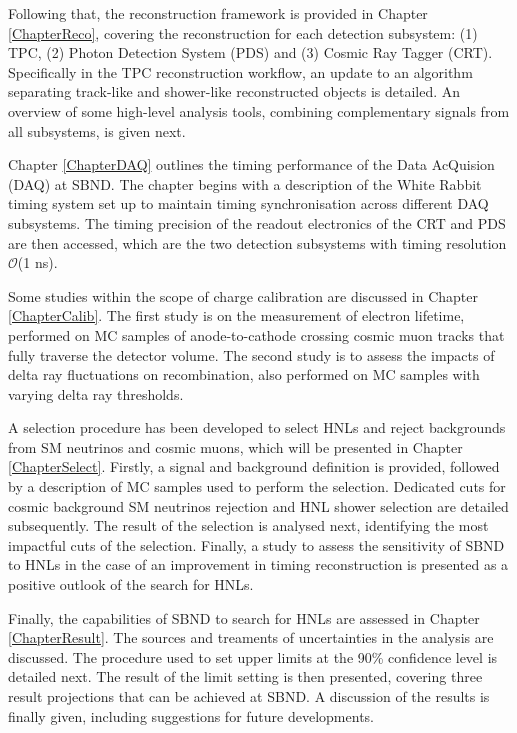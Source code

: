Following that, the reconstruction framework is provided in Chapter \ref{ChapterReco}, covering the reconstruction for each detection subsystem: (1) TPC, (2) Photon Detection System (PDS) and (3) Cosmic Ray Tagger (CRT).
Specifically in the TPC reconstruction workflow, an update to an algorithm separating track-like and shower-like reconstructed objects is detailed.
An overview of some high-level analysis tools, combining complementary signals from all subsystems, is given next. 
                                                                                                                       
Chapter \ref{ChapterDAQ} outlines the timing performance of the Data AcQuision (DAQ) at SBND.
The chapter begins with a description of the White Rabbit timing system set up to maintain timing synchronisation across different DAQ subsystems.
The timing precision of the readout electronics of the CRT and PDS are then accessed, which are the two detection subsystems with timing resolution $\mathcal{O}$(1 ns).

Some studies within the scope of charge calibration are discussed in Chapter \ref{ChapterCalib}.
The first study is on the measurement of electron lifetime, performed on MC samples of anode-to-cathode crossing cosmic muon tracks that fully traverse the detector volume.
The second study is to assess the impacts of delta ray fluctuations on recombination, also performed on MC samples with varying delta ray thresholds.  
                                                                                                                                            
A selection procedure has been developed to select HNLs and reject backgrounds from SM neutrinos and cosmic muons, which will be presented in Chapter \ref{ChapterSelect}.
Firstly, a signal and background definition is provided, followed by a description of MC samples used to perform the selection.
Dedicated cuts for cosmic background SM neutrinos rejection and HNL shower selection are detailed subsequently.
The result of the selection is analysed next, identifying the most impactful cuts of the selection.
Finally, a study to assess the sensitivity of SBND to HNLs in the case of an improvement in timing reconstruction is presented as a positive outlook of the search for HNLs.
                                                                                                                                                     
Finally, the capabilities of SBND to search for HNLs are assessed in Chapter \ref{ChapterResult}.
The sources and treaments of uncertainties in the analysis are discussed.
The procedure used to set upper limits at the 90\% confidence level is detailed next. 
The result of the limit setting is then presented, covering three result projections that can be achieved at SBND.
A discussion of the results is finally given, including suggestions for future developments.                        

